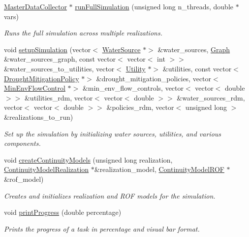 \begin{DoxyCompactItemize}
\mbox{\hyperlink{classMasterDataCollector}{Master\+Data\+Collector}} $\ast$ \mbox{\hyperlink{classSimulation_a401edb8c7e3390fee0340212993bcd79}{run\+Full\+Simulation}} (unsigned long n\+\_\+threads, double $\ast$vars)
\begin{DoxyCompactList}\small\item\em Runs the full simulation across multiple realizations. \end{DoxyCompactList}\item 
void \mbox{\hyperlink{classSimulation_ac9ff965191f13b1ce044344fd1e5d0ac}{setup\+Simulation}} (vector$<$ \mbox{\hyperlink{classWaterSource}{Water\+Source}} $\ast$$>$ \&water\+\_\+sources, \mbox{\hyperlink{classGraph}{Graph}} \&water\+\_\+sources\+\_\+graph, const vector$<$ vector$<$ int $>$$>$ \&water\+\_\+sources\+\_\+to\+\_\+utilities, vector$<$ \mbox{\hyperlink{classUtility}{Utility}} $\ast$$>$ \&utilities, const vector$<$ \mbox{\hyperlink{classDroughtMitigationPolicy}{Drought\+Mitigation\+Policy}} $\ast$$>$ \&drought\+\_\+mitigation\+\_\+policies, vector$<$ \mbox{\hyperlink{classMinEnvFlowControl}{Min\+Env\+Flow\+Control}} $\ast$$>$ \&min\+\_\+env\+\_\+flow\+\_\+controls, vector$<$ vector$<$ double $>$$>$ \&utilities\+\_\+rdm, vector$<$ vector$<$ double $>$$>$ \&water\+\_\+sources\+\_\+rdm, vector$<$ vector$<$ double $>$$>$ \&policies\+\_\+rdm, vector$<$ unsigned long $>$ \&realizations\+\_\+to\+\_\+run)
\begin{DoxyCompactList}\small\item\em Set up the simulation by initializing water sources, utilities, and various components. \end{DoxyCompactList}\item 
void \mbox{\hyperlink{classSimulation_aa2e2863a0038345c46dd827b97008347}{create\+Continuity\+Models}} (unsigned long realization, \mbox{\hyperlink{classContinuityModelRealization}{Continuity\+Model\+Realization}} $\ast$\&realization\+\_\+model, \mbox{\hyperlink{classContinuityModelROF}{Continuity\+Model\+R\+OF}} $\ast$\&rof\+\_\+model)
\begin{DoxyCompactList}\small\item\em Creates and initializes realization and R\+OF models for the simulation. \end{DoxyCompactList}\item 
void \mbox{\hyperlink{classSimulation_a3279f9efae2c262b54ad4d16c631033c}{print\+Progress}} (double percentage)
\begin{DoxyCompactList}\small\item\em Prints the progress of a task in percentage and visual bar format. \end{DoxyCompactList}\end{DoxyCompactItemize}


